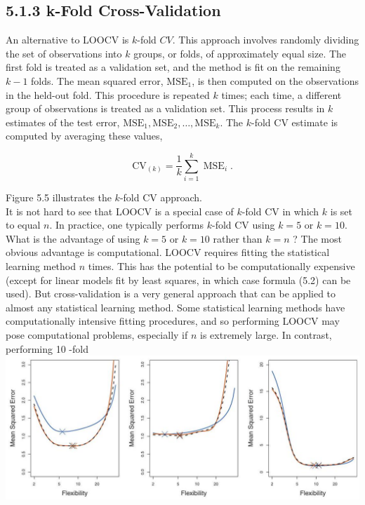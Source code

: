 \documentclass[10pt]{article}
\begin{document}
\subsection*{5.1.3 k-Fold Cross-Validation}
An alternative to LOOCV is $k$-fold $C V$. This approach involves randomly dividing the set of observations into $k$ groups, or folds, of approximately equal size. The first fold is treated as a validation set, and the method is fit on the remaining $k-1$ folds. The mean squared error, $\mathrm{MSE}_{1}$, is then computed on the observations in the held-out fold. This procedure is repeated $k$ times; each time, a different group of observations is treated as a validation set. This process results in $k$ estimates of the test error, $\mathrm{MSE}_{1}, \mathrm{MSE}_{2}, \ldots, \mathrm{MSE}_{k}$. The $k$-fold CV estimate is computed by averaging these values,


\begin{equation*}
\mathrm{CV}_{(k)}=\frac{1}{k} \sum_{i=1}^{k} \operatorname{MSE}_{i} . \tag{5.3}
\end{equation*}


Figure 5.5 illustrates the $k$-fold CV approach.\\
It is not hard to see that LOOCV is a special case of $k$-fold CV in which $k$ is set to equal $n$. In practice, one typically performs $k$-fold CV using $k=5$ or $k=10$. What is the advantage of using $k=5$ or $k=10$ rather than $k=n$ ? The most obvious advantage is computational. LOOCV requires fitting the statistical learning method $n$ times. This has the potential to be computationally expensive (except for linear models fit by least squares, in which case formula (5.2) can be used). But cross-validation is a very general approach that can be applied to almost any statistical learning method. Some statistical learning methods have computationally intensive fitting procedures, and so performing LOOCV may pose computational problems, especially if $n$ is extremely large. In contrast, performing 10 -fold\\
\includegraphics[max width=\textwidth, center]{2025_05_05_efe77898333945044de4g-197}
\end{document}
